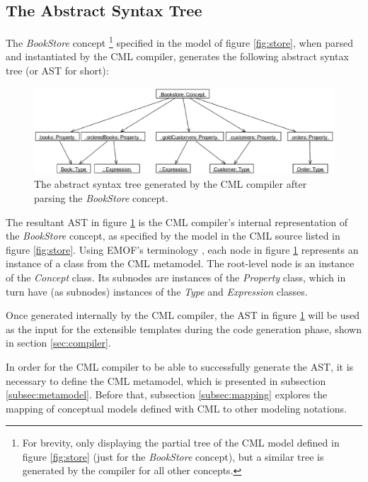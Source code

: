 \subsection{The Abstract Syntax Tree}\label{subsec:ast}

The \emph{BookStore} concept
\footnote{For brevity,
only displaying the partial tree of the CML model defined in figure \ref{fig:store} (just for the \emph{BookStore} concept), 
but a similar tree is generated by the compiler for all other concepts.}
specified in the model of figure \ref{fig:store},
when parsed and instantiated by the CML compiler,
generates the following abstract syntax tree (or AST for short):

\begin{figure}
\centering
\includegraphics[width=\textwidth]{language/figure-ast}
\caption{The abstract syntax tree generated by the CML compiler after parsing the \emph{BookStore} concept.}
\label{fig:ast}
\end{figure}

The resultant AST in figure \ref{fig:ast} is the CML compiler's internal representation of the \emph{BookStore} concept,
as specified by the model in the CML source listed in figure \ref{fig:store}. 
Using EMOF's terminology \cite{mof},
each node in figure \ref{fig:ast} represents an instance of a class from the CML metamodel.
The root-level node is an instance of the \emph{Concept} class. 
Its subnodes are instances of the \emph{Property} class,
which in turn have (as subnodes) instances of the \emph{Type} and \emph{Expression} classes.

Once generated internally by the CML compiler,
the AST in figure \ref{fig:ast} will be used as the input for the extensible templates during the code generation phase,
shown in section \ref{sec:compiler}.

In order for the CML compiler to be able to successfully generate the AST,
it is necessary to define the CML metamodel,
which is presented in subsection \ref{subsec:metamodel}.
Before that,
subsection \ref{subsec:mapping} explores the mapping of conceptual models defined with CML to other modeling notations.

